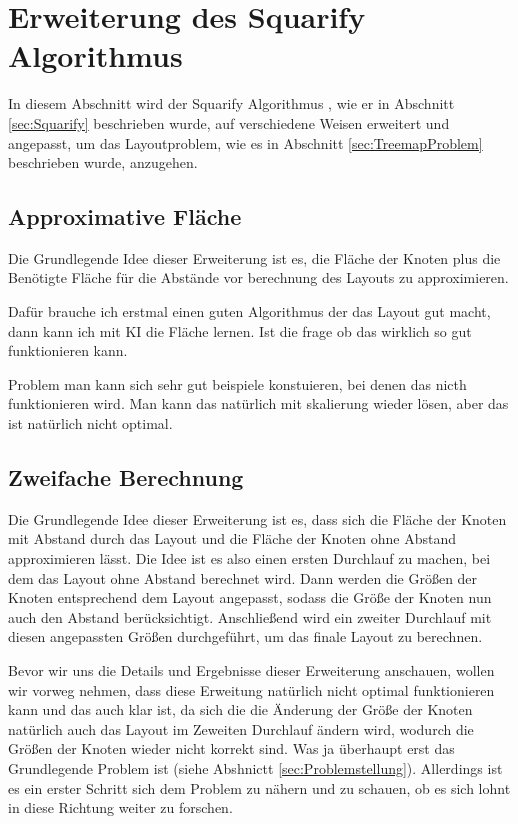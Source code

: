 \section{Erweiterung des Squarify Algorithmus} \label{sec:VerbesserungSquarify}
In diesem Abschnitt wird der Squarify Algorithmus \cite{bruls2000squarified}, wie er in Abschnitt \ref{sec:Squarify} beschrieben wurde, auf verschiedene Weisen erweitert und angepasst, um das Layoutproblem, wie es in Abschnitt \ref{sec:TreemapProblem} beschrieben wurde, anzugehen. 

\subsection{Approximative Fläche} \label{sec:ApproxFläche}
Die Grundlegende Idee dieser Erweiterung ist es, die Fläche der Knoten plus die Benötigte Fläche für die Abstände vor berechnung des Layouts zu approximieren.

Dafür brauche ich erstmal einen guten Algorithmus der das Layout gut macht, dann kann ich mit KI die Fläche lernen. Ist die frage ob das wirklich so gut funktionieren kann.

Problem man kann sich sehr gut beispiele konstuieren, bei denen das nicth funktionieren wird. Man kann das natürlich mit skalierung wieder lösen, aber das ist natürlich nicht optimal.

\subsection{Zweifache Berechnung} \label{sec:ZweifachBerechnung}
Die Grundlegende Idee dieser Erweiterung ist es, dass sich die Fläche der Knoten mit Abstand durch das Layout und die Fläche der Knoten ohne Abstand approximieren lässt. Die Idee ist es also einen ersten Durchlauf zu machen, bei dem das Layout ohne Abstand berechnet wird. Dann werden die Größen der Knoten entsprechend dem Layout angepasst, sodass die Größe der Knoten nun auch den Abstand berücksichtigt. Anschließend wird ein zweiter Durchlauf mit diesen angepassten Größen durchgeführt, um das finale Layout zu berechnen.

Bevor wir uns die Details und Ergebnisse dieser Erweiterung anschauen, wollen wir vorweg nehmen, dass diese Erweitung natürlich nicht optimal funktionieren kann und das auch klar ist, da sich die die Änderung der Größe der Knoten natürlich auch das Layout im Zeweiten Durchlauf ändern wird, wodurch die Größen der Knoten wieder nicht korrekt sind. Was ja überhaupt erst das Grundlegende Problem ist (siehe Abshnictt \ref{sec:Problemstellung}). Allerdings ist es ein erster Schritt sich dem Problem zu nähern und zu schauen, ob es sich lohnt in diese Richtung weiter zu forschen.

